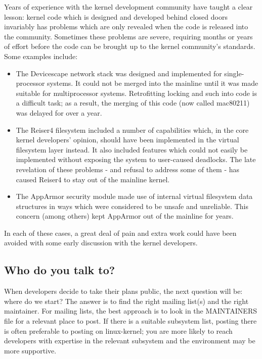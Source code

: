 \documentclass[a4paper,8pt,english]{sphinxmanual}
\begin{document}
Years of experience with the kernel development community have taught a
clear lesson: kernel code which is designed and developed behind closed
doors invariably has problems which are only revealed when the code is
released into the community.  Sometimes these problems are severe,
requiring months or years of effort before the code can be brought up to
the kernel community's standards.  Some examples include:
\begin{itemize}
\item {} 
The Devicescape network stack was designed and implemented for
single-processor systems.  It could not be merged into the mainline
until it was made suitable for multiprocessor systems.  Retrofitting
locking and such into code is a difficult task; as a result, the merging
of this code (now called mac80211) was delayed for over a year.

\item {} 
The Reiser4 filesystem included a number of capabilities which, in the
core kernel developers' opinion, should have been implemented in the
virtual filesystem layer instead.  It also included features which could
not easily be implemented without exposing the system to user-caused
deadlocks.  The late revelation of these problems - and refusal to
address some of them - has caused Reiser4 to stay out of the mainline
kernel.

\item {} 
The AppArmor security module made use of internal virtual filesystem
data structures in ways which were considered to be unsafe and
unreliable.  This concern (among others) kept AppArmor out of the
mainline for years.

\end{itemize}

In each of these cases, a great deal of pain and extra work could have been
avoided with some early discussion with the kernel developers.


\subsection{Who do you talk to?}
\label{process/3.Early-stage:who-do-you-talk-to}
When developers decide to take their plans public, the next question will
be: where do we start?  The answer is to find the right mailing list(s) and
the right maintainer.  For mailing lists, the best approach is to look in
the MAINTAINERS file for a relevant place to post.  If there is a suitable
subsystem list, posting there is often preferable to posting on
linux-kernel; you are more likely to reach developers with expertise in the
relevant subsystem and the environment may be more supportive.
\end{document}
